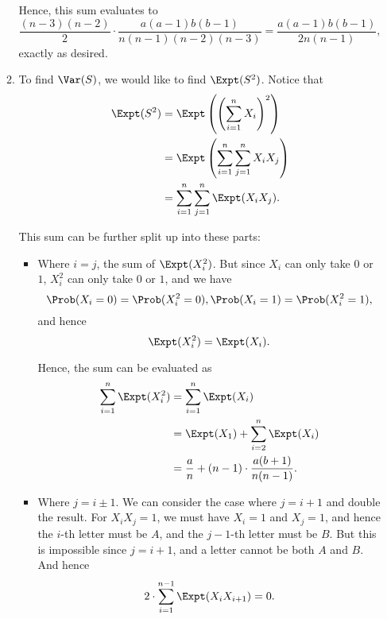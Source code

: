 \begin{enumerate}
\begin{enumerate}
                    Hence, this sum evaluates to
                    \[
                        \frac{(n - 3)(n - 2)}{2} \cdot \frac{a (a - 1) b (b - 1)}{n (n - 1) (n - 2) (n - 3)} = \frac{a (a - 1) b (b - 1)}{2n(n - 1)},
                    \]
                    exactly as desired.

              \item To find \(\Var(S)\), we would like to find \(\Expt(S^2)\). Notice that
                    \begin{align*}
                        \Expt(S^2) & = \Expt\left(\left(\sum_{i = 1}^{n} X_i\right)^2\right)        \\
                                   & = \Expt \left(\sum_{i = 1}^{n} \sum_{j = 1}^{n} X_i X_j\right) \\
                                   & = \sum_{i = 1}^{n} \sum_{j = 1}^{n} \Expt(X_i X_j).
                    \end{align*}

                    This sum can be further split up into these parts:
                    \begin{itemize}
                        \item Where \(i = j\), the sum of \(\Expt(X_i^2)\). But since \(X_i\) can only take \(0\) or \(1\), \(X_i^2\) can only take \(0\) or \(1\), and we have
                              \[
                                  \Prob(X_i = 0) = \Prob(X_i^2 = 0), \Prob(X_i = 1) = \Prob(X_i^2 = 1),
                              \]
                              and hence
                              \[
                                  \Expt(X_i^2) = \Expt(X_i).
                              \]

                              Hence, the sum can be evaluated as
                              \begin{align*}
                                  \sum_{i = 1}^{n} \Expt(X_i^2) & = \sum_{i = 1}^{n} \Expt(X_i)                            \\
                                                                & = \Expt(X_1) + \sum_{i = 2}^{n} \Expt(X_i)               \\
                                                                & = \frac{a}{n} + (n - 1) \cdot \frac{a(b + 1)}{n(n - 1)}.
                              \end{align*}

                        \item Where \(j = i \pm 1\). We can consider the case where \(j = i + 1\) and double the result. For \(X_i X_j = 1\), we must have \(X_i = 1\) and \(X_j = 1\), and hence the \(i\)-th letter must be \(A\), and the \(j - 1\)-th letter must be \(B\). But this is impossible since \(j = i + 1\), and a letter cannot be both \(A\) and \(B\). And hence
                              \begin{align*}
                                  2 \cdot \sum_{i = 1}^{n - 1} \Expt(X_i X_{i + 1}) = 0.
                              \end{align*}


\end{itemize}
\end{enumerate}
\end{enumerate}
